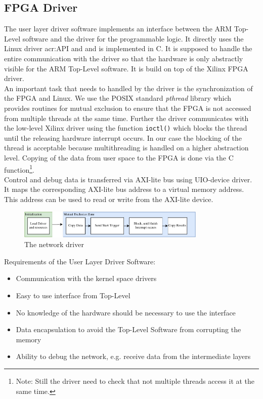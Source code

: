 \subsection{FPGA Driver}

The user layer driver software implements an interface between the ARM Top-Level software and the driver for the programmable logic. It directly uses the Linux driver \gls{acr:API} and and is implemented in C. It is supposed to handle the entire communication with the driver so that the hardware is only abstractly visible for the ARM Top-Level software. It is build on top of the Xilinx FPGA driver. \\
\noindent
An important task that needs to handled by the driver is the synchronization of the FPGA and Linux. We use the POSIX standard \emph{pthread} library which provides routines for mutual exclusion to ensure that the FPGA is not accessed from multiple threads at the same time. Further the driver communicates with the low-level Xilinx driver using the function \texttt{ioctl()} which blocks the thread until the releasing hardware interrupt occurs. In our case the blocking of the thread is acceptable because multithreading is handled on a higher abstraction level. Copying of the data from user space to the FPGA is done via the C function\footnote{Note: Still the driver need to check that not multiple threads access it at the same time.}. \\
Control and debug data is transferred via AXI-lite bus using UIO-device driver. It maps the corresponding AXI-lite bus address to a virtual memory address. This address can be used to read or write from the AXI-lite device. 

\begin{figure}[hbt]
  \centering
  \includegraphics[width=0.8\textwidth]{img/eggdriver.pdf}
  \caption{The network driver}
  \label{fig:sw-python-eggdriver-build}
\end{figure}

Requirements of the User Layer Driver Software:
\begin{itemize} 
	\item Communication with the kernel space drivers 
	\item Easy to use interface from Top-Level 
	\item No knowledge of the hardware should be necessary to use the interface
	\item Data encapsulation to avoid the Top-Level Software from corrupting the memory 
	\item Ability to debug the network, e.g. receive data from the intermediate layers
\end{itemize}

